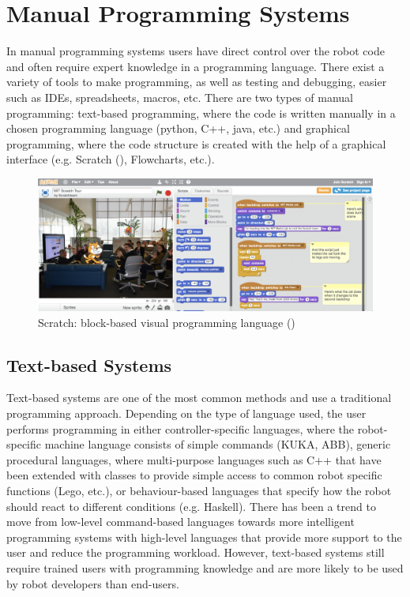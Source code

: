 \section{Manual Programming Systems}\label{subsec:Manual Programming Systems}
In manual programming systems users have direct control over the robot code
and often require expert knowledge in a programming language. %
There exist a variety of tools to make programming, as well as testing and debugging, easier such as IDEs, spreadsheets, macros, etc.
There are two types of manual programming: text-based programming, where the code is written manually in a chosen programming language (python, C++, java, etc.) and graphical programming, where the code structure is created with the help of a graphical interface (e.g. Scratch (\cite{majed2014learn}), Flowcharts, etc.). 

\begin{figure}[h]
	\centering
	\includegraphics[width=\linewidth]{figures/scratch-interface}
	\caption{Scratch: block-based visual programming language (\cite{majed2014learn})}
	\label{fig:scratch-interface}
\end{figure} 

\subsection{Text-based Systems}\label{sssec:Text-based Systems}
Text-based systems are one of the most common methods and use a traditional programming approach. 
Depending on the type of language used, the user performs programming in either controller-specific languages, where the robot-specific machine language consists of simple commands ({KUKA, ABB}), generic procedural languages, where multi-purpose languages such as C++ that have been extended with classes to provide simple access to common robot specific functions ({Lego, etc.}), or behaviour-based languages that specify how the robot should react to different conditions (e.g. Haskell). 
There has been a trend to move from low-level command-based languages towards more intelligent programming systems with high-level languages that provide more support to the user and reduce the programming workload.
However, text-based systems still require trained users with programming knowledge and are more likely to be used by robot developers than end-users.


